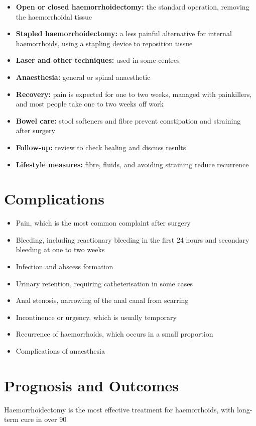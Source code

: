 \begin{itemize}
    \item \textbf{Open or closed haemorrhoidectomy:} the standard operation, removing the haemorrhoidal tissue
    \item \textbf{Stapled haemorrhoidectomy:} a less painful alternative for internal haemorrhoids, using a stapling device to reposition tissue
    \item \textbf{Laser and other techniques:} used in some centres
    \item \textbf{Anaesthesia:} general or spinal anaesthetic
    \item \textbf{Recovery:} pain is expected for one to two weeks, managed with painkillers, and most people take one to two weeks off work
    \item \textbf{Bowel care:} stool softeners and fibre prevent constipation and straining after surgery
    \item \textbf{Follow-up:} review to check healing and discuss results
    \item \textbf{Lifestyle measures:} fibre, fluids, and avoiding straining reduce recurrence
\end{itemize}

\section*{Complications}
\begin{itemize}
    \item Pain, which is the most common complaint after surgery
    \item Bleeding, including reactionary bleeding in the first 24 hours and secondary bleeding at one to two weeks
    \item Infection and abscess formation
    \item Urinary retention, requiring catheterisation in some cases
    \item Anal stenosis, narrowing of the anal canal from scarring
    \item Incontinence or urgency, which is usually temporary
    \item Recurrence of haemorrhoids, which occurs in a small proportion
    \item Complications of anaesthesia
\end{itemize}

\section*{Prognosis and Outcomes}
Haemorrhoidectomy is the most effective treatment for haemorrhoids, with long-term cure in over 90%

